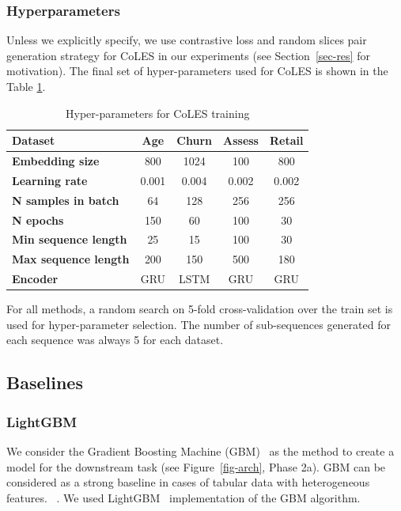 \documentclass[sigconf, anonymous]{acmart}
\begin{document}
\subsubsection{Hyperparameters}

Unless we explicitly specify, we use contrastive loss and random slices pair generation strategy for CoLES in our experiments (see Section~\ref{sec-res} for motivation). The final set of hyper-parameters used for CoLES is shown in the Table \ref{tab-hyper}.

\begin{table}
\centering
\caption{Hyper-parameters for CoLES training}
\begin{tabularx}{\linewidth}{Xcccc}
\toprule
\textbf{Dataset} & \textbf{Age} & \textbf{Churn} & \textbf{Assess} & \textbf{Retail} \\
\midrule
\textbf{Embedding size} & 800 & 1024 & 100 & 800 \\
\textbf{Learning rate} & 0.001 & 0.004 & 0.002 & 0.002 \\
\textbf{N samples in batch} & 64 & 128 & 256 & 256 \\
\textbf{N epochs} & 150 & 60 & 100 & 30 \\
\textbf{Min sequence length} & 25 & 15 & 100 & 30 \\
\textbf{Max sequence length} & 200 & 150 & 500 & 180 \\
\textbf{Encoder} & GRU & LSTM & GRU & GRU \\
\bottomrule
\end{tabularx}
\small{For all methods, a random search on 5-fold cross-validation over the train set is used for hyper-parameter selection. The number of sub-sequences generated for each sequence was always 5 for each dataset.}
\label{tab-hyper}
\end{table}

\subsection{Baselines} \label{sec-baselines}


\subsubsection{LightGBM}

We consider the Gradient Boosting Machine (GBM)~\citep{Friedman2001GreedyFA} as the method to create a model for the downstream task (see Figure~\ref{fig-arch}, Phase 2a). GBM can be considered as a strong baseline in cases of tabular data with heterogeneous features.
~\citep{Wu2009AdaptingBF, Vorobev2019LearningTS, Zhang2015AGB, Niu2019ACS}. We used LightGBM~\citep{Ke2017LightGBMAH} implementation of the GBM algorithm.
\end{document}
